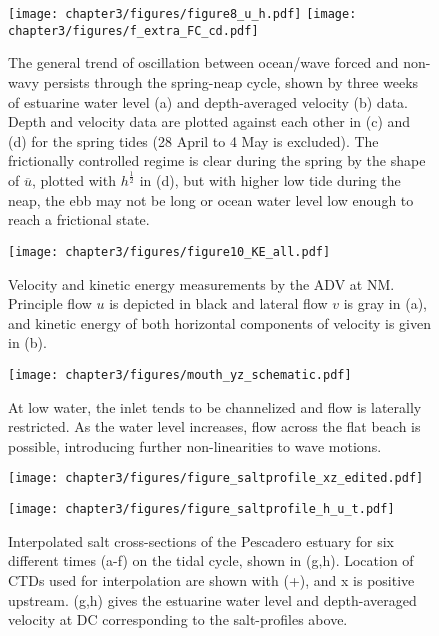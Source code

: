 \begin{figure}
\centering
\texttt{[image: chapter3/figures/figure8\_u\_h.pdf]}
\texttt{[image: chapter3/figures/f\_extra\_FC\_cd.pdf]}

\protect\caption{The general trend of oscillation between ocean/wave forced and non-wavy
persists through the spring-neap cycle, shown by three weeks of estuarine
water level (a) and depth-averaged velocity (b) data. Depth and velocity
data are plotted against each other in (c) and (d) for the spring
tides (28 April to 4 May is excluded). The frictionally controlled
regime is clear during the spring by the shape of $\overline{u}$,
plotted with $h^{\frac{1}{2}}$ in (d), but with higher low tide during
the neap, the ebb may not be long or ocean water level low enough
to reach a frictional state. \label{f8_ltHU}}
\end{figure}


\begin{figure}
\texttt{[image: chapter3/figures/figure10\_KE\_all.pdf]}\protect\caption{Velocity and kinetic energy measurements by the ADV at NM. Principle
flow $u$ is depicted in black and lateral flow $v$ is gray in (a),
and kinetic energy of both horizontal components of velocity is given
in (b). \label{f9_KE}}
\end{figure}


\begin{figure}
\centering
\texttt{[image: chapter3/figures/mouth\_yz\_schematic.pdf]} \caption{At low water, the inlet tends to be channelized and flow is laterally
restricted. As the water level increases, flow across the flat beach
is possible, introducing further non-linearities to wave motions.} \label{f10_mouth_yz}

\end{figure}



\begin{figure}
\texttt{[image: chapter3/figures/figure\_saltprofile\_xz\_edited.pdf]}

\texttt{[image: chapter3/figures/figure\_saltprofile\_h\_u\_t.pdf]}

\protect\caption{Interpolated salt cross-sections of the Pescadero estuary for six
different times (a-f) on the tidal cycle, shown in (g,h). Location
of CTDs used for interpolation are shown with (+), and x is positive
upstream. (g,h) gives the estuarine water level and depth-averaged
velocity at DC corresponding to the salt-profiles above. \label{f10_Sxz}}
\end{figure}


